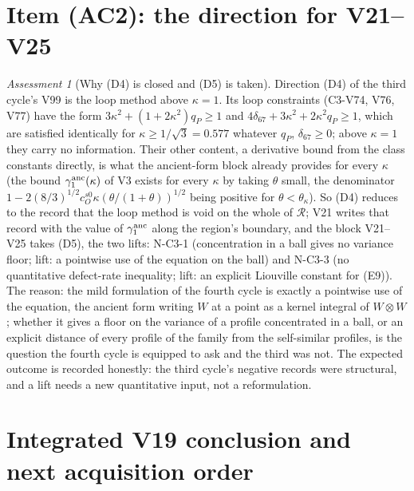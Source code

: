 \documentclass[11pt]{article}
\theoremstyle{plain}
\theoremstyle{definition}
\theoremstyle{remark}
\newtheorem{assessment}[theorem]{Assessment}
\begin{document}
\section{Item (AC2): the direction for V21--V25}
\label{sec:c4v19-direction}

\begin{assessment}[Why (D4) is closed and (D5) is taken]
\label{ass:c4v19-direction}
Direction (D4) of the third cycle's V99 is the loop method above
\(\kappa=1\).  Its loop constraints (C3-V74, V76, V77) have the form
\(3\kappa^2+(1+2\kappa^2)q_P\ge1\) and \(4\delta_{67}+3\kappa^2+2\kappa^2q_P\ge1\), which are satisfied
identically for \(\kappa\ge1/\sqrt3=0.577\) whatever \(q_P\), \(\delta_{67}\ge0\); above \(\kappa=1\)
they carry no information.  Their other content, a derivative bound
from the class constants directly, is what the ancient-form block
already provides for every \(\kappa\) (the bound \(\gamma_1^{\rm anc}(\kappa)\) of V3 exists for
every \(\kappa\) by taking \(\theta\) small, the denominator
\(1-2(8/3)^{1/2}c_O^{s0}\kappa(\theta/(1+\theta))^{1/2}\) being positive for \(\theta<\theta_\kappa\)).  So (D4)
reduces to the record that the loop method is void on the whole of
\(\mathcal R\); V21 writes that record with the value of \(\gamma_1^{\rm anc}\) along the
region's boundary, and the block V21--V25 takes (D5), the two lifts:
N-C3-1 (concentration in a ball gives no variance floor; lift: a
pointwise use of the equation on the ball) and N-C3-3 (no
quantitative defect-rate inequality; lift: an explicit Liouville
constant for (E9)).  The reason: the mild formulation of the fourth
cycle is exactly a pointwise use of the equation, the ancient form
writing \(W\) at a point as a kernel integral of \(W\otimes W\); whether it
gives a floor on the variance of a profile concentrated in a ball,
or an explicit distance of every profile of the family from the
self-similar profiles, is the question the fourth cycle is equipped
to ask and the third was not.  The expected outcome is recorded
honestly: the third cycle's negative records were structural, and a
lift needs a new quantitative input, not a reformulation.
\end{assessment}

\section{Integrated V19 conclusion and next acquisition order}
\label{sec:c4v19-conclusion}
\end{document}
